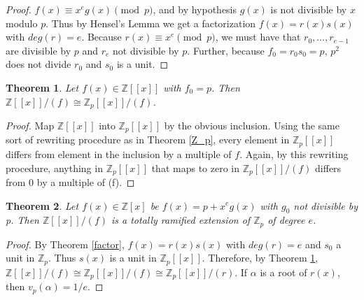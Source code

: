 \documentclass{article}
\newtheorem{theorem}{Theorem}
\begin{document}
\begin{proof}
$f(x) \equiv x^e g(x) \pmod{p}$, and by hypothesis $g(x)$ is not divisible by $x$ modulo $p$.  Thus by Hensel's Lemma we get a factorization $f(x) = r(x)s(x)$ with $deg(r) = e$.  Because $r(x) \equiv x^e \pmod{p}$, we must have that $r_0, \ldots, r_{e-1}$ are divisible by $p$ and $r_e$ not divisible by $p$.  Further, because $f_0 = r_0 s_0 = p$, $p^2$ does not divide $r_0$ and $s_0$ is a unit.
\end{proof}

\begin{theorem}\label{expand}
Let $f(x) \in \mathbb{Z}[[x]]$ with $f_0 = p$.  Then $\mathbb{Z}[[x]]/(f) \cong \mathbb{Z}_p[[x]]/(f)$.
\end{theorem}

\begin{proof}
Map $\mathbb{Z}[[x]]$ into $\mathbb{Z}_p[[x]]$ by the obvious inclusion.  Using the same sort of rewriting procedure as in Theorem \ref{Z_p}, every element in $\mathbb{Z}_p[[x]]$ differs from element in the inclusion by a multiple of $f$.  Again, by this rewriting procedure, anything in $\mathbb{Z}_p[[x]]$ that maps to zero in $\mathbb{Z}_p[[x]]/(f)$ differs from 0 by a multiple of (f).
\end{proof}

\begin{theorem}
Let $f(x) \in \mathbb{Z}[x]$ be $f(x) = p + x^e g(x)$ with $g_0$ not divisible by p.  Then $\mathbb{Z}[[x]]/(f)$ is a totally ramified extension of $\mathbb{Z}_p$ of degree $e$.
\end{theorem}

\begin{proof}
By Theorem \ref{factor}, $f(x) = r(x)s(x)$ with $deg(r) = e$ and $s_0$ a unit in $\mathbb{Z}_p$.  Thus $s(x)$ is a unit in $\mathbb{Z}_p[[x]]$.  Therefore, by Theorem \ref{expand}, $\mathbb{Z}[[x]]/(f) \cong \mathbb{Z}_p[[x]]/(f) \cong \mathbb{Z}_p[[x]]/(r)$.  If $\alpha$ is a root of $r(x)$, then $v_p(\alpha) = 1/e$.
\end{proof}



\end{document}
